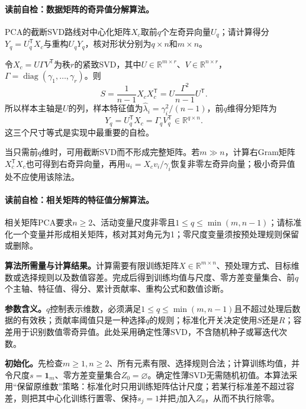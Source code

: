 \paragraph{读前自检：数据矩阵的奇异值分解算法。}PCA的截断SVD路线对中心化矩阵$X_c$取前$q$个左奇异向量$U_q$；请计算得分$Y_q=U_q^{\mathsf T}X_c$与重构$U_qY_q$，核对形状分别为$q\times n$和$m\times n$。\par

令$X_c=U\Gamma V^{\mathsf T}$为秩$r$的紧致SVD，其中$U\in\mathbb R^{m\times r}$、$V\in\mathbb R^{n\times r}$，$\Gamma=\operatorname{diag}(\gamma_1,\ldots,\gamma_r)$。则
\[
S=\frac1{n-1}X_cX_c^{\mathsf T}
=U\frac{\Gamma^2}{n-1}U^{\mathsf T}.
\]
所以样本主轴是$U$的列，样本特征值为$\widehat\lambda_i=\gamma_i^2/(n-1)$，前$q$维得分矩阵为
\[
Y_q=U_q^{\mathsf T}X_c=\Gamma_qV_q^{\mathsf T}\in\mathbb R^{q\times n}.
\]
这三个尺寸等式是实现中最重要的自检。

当只需前$q$维时，可用截断SVD而不形成完整矩阵。若$m\gg n$，计算右Gram矩阵$X_c^{\mathsf T}X_c$也可得到右奇异向量，再用$u_i=X_cv_i/\gamma_i$恢复非零左奇异向量；极小奇异值处不应使用该除法。


\paragraph{读前自检：相关矩阵的特征值分解算法。}相关矩阵PCA要求$n\ge2$、活动变量尺度非零且$1\le q\le\min(m,n-1)$；请标准化一个变量并形成相关矩阵，核对其对角元为1；零尺度变量须按预处理规则保留或删除。\par

\label{struct:V4-C04-CH20}
\textbf{算法所需量与计算结果。}计算需要有限训练矩阵$X\in\mathbb R^{m\times n}$、预处理方式、目标维数或选择规则以及数值容差。完成后得到训练均值与尺度、零方差变量集合、前$q$个主轴、特征值、得分、累计贡献率、重构公式和数值诊断。

\label{struct:V4-C04-CH21}
\textbf{参数含义。}$q$控制表示维数，必须满足$1\le q\le\min(m,n-1)$且不超过处理后数据的有效秩；贡献率阈值只是一种选择$q$的规则；标准化开关决定使用$S$还是$R$；容差用于识别数值零奇异值。此处采用确定性薄SVD，不含随机种子或幂迭代次数。

\label{struct:V4-C04-CH22}
\textbf{初始化。}先检查$m\ge1,n\ge2$、所有元素有限、选择规则合法；计算训练均值，并令尺度$s=\mathbf1_m$、零方差变量集合$Z_0=\varnothing$。确定性薄SVD无需随机初值。本算法采用“保留原维数”策略：标准化时只用训练矩阵估计尺度；若某行标准差不超过容差，则把其中心化训练行置零、保持$s_j=1$并把$j$加入$Z_0$，从而不执行除零。

